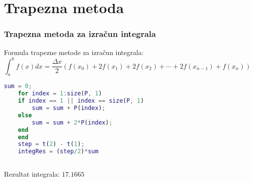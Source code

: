 \documentclass{beamer}
\begin{document}
\section{Trapezna metoda}
\begin{frame}[fragile]
\frametitle{Trapezna metoda za izračun integrala}
    Formula trapezne metode za izračun integrala:
    \[
    \int_a^b f(x)dx = \frac{\Delta x}{2} \left(f(x_0) + 2f(x_1) + 2f(x_2) + \cdots + 2f(x_{n-1}) + f(x_n)\right)
    \]
    \begin{lstlisting}[language=Matlab]
    sum = 0;
    for index = 1:size(P, 1)
    if index == 1 || index == size(P, 1)
        sum = sum + P(index);
    else
        sum = sum + 2*P(index);
    end
    end
    step = t(2) - t(1);
    integRes = (step/2)*sum
    
    \end{lstlisting}

    Rezultat integrala: $17.1665$
\end{frame}
\end{document}
